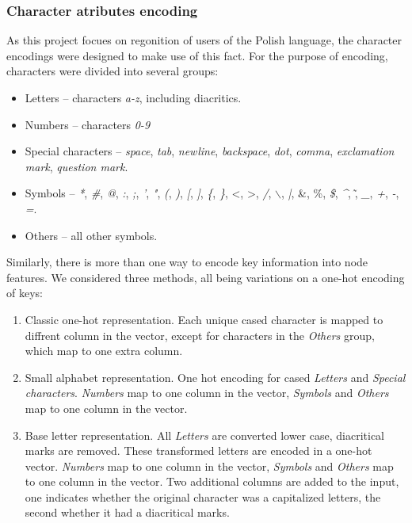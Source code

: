 \subsubsection{Character atributes encoding}
As this project focues on regonition of users of the Polish language, the character encodings were designed to make use of this fact. For the purpose of encoding, characters were divided into several groups:\\
\begin{itemize}
	\item Letters -- characters \textit{a-z}, including diacritics.
	\item Numbers -- characters \textit{0-9}
	\item Special characters -- \textit{space}, \textit{tab}, \textit{newline}, \textit{backspace}, \textit{dot}, \textit{comma}, \textit{exclamation mark}, \textit{question mark}.
	\item Symbols -- \textit{*}, \textit{\#}, \textit{@}, \textit{:}, \textit{;},   \textit{'}, \textit{"}, \textit{(}, \textit{)}, \textit{[}, \textit{]}, \textit{\{}, \textit{\}}, \textless, \textgreater, \textit{/}, \textit{$\backslash$}, \textit{|}, \&, \%, \textit{\$}, \textit{\^}, \~, \textit{\_}, \textit{+}, \textit{-}, \textit{=}. 
	\item Others -- all other symbols.
\end{itemize}
Similarly, there is more than one way to encode key information into node features.
We considered three methods, all being variations on a one-hot encoding of keys:
\begin{enumerate}
	\item Classic one-hot representation. Each unique cased character is mapped to diffrent column in the vector, except for characters in the \textit{Others} group, which map to one extra column.
	\item Small alphabet representation. One hot encoding for cased \textit{Letters} and \textit{Special characters}. \textit{Numbers} map to one column in the vector, \textit{Symbols} and \textit{Others} map to one column in the vector.
	\item Base letter representation. All \textit{Letters} are converted lower case, diacritical marks are removed. These transformed letters are encoded in a one-hot vector. \textit{Numbers} map to one column in the vector, \textit{Symbols} and \textit{Others} map to one column in the vector. Two additional columns are added to the input, one indicates whether the original character was a capitalized letters, the second whether it had a diacritical marks.
\end{enumerate}


